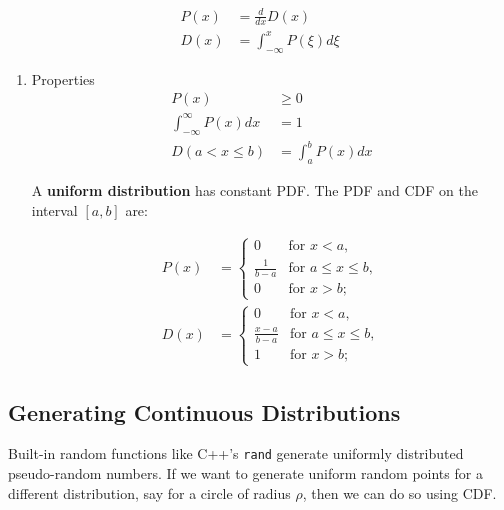 \documentclass[11pt]{article}
\begin{document}
\begin{align*}
    P\left( x \right) &= \frac{d}{dx}D\left( x \right) \\
    D\left( x \right) &= \int_{-\infty}^{x} P\left( \xi \right) d\xi
\end{align*}

\begin{enumerate}
\item Properties
\label{sec:orgbbf2d6b}
 \begin{align*}
     P\left( x \right) &\geq 0 \\
     \int_{-\infty}^{\infty} P\left( x \right)dx &= 1 \\
     D\left( a < x \leq b \right) &= \int_{a}^{b} P\left( x \right)dx
\end{align*}

A \textbf{uniform distribution} has constant PDF. The PDF and CDF on the interval \(\left[ a,b \right]\) are:

\begin{align*}
    P\left( x \right) &= \begin{cases}
                             0 &\text{for } x < a, \\
                             \frac{1}{b - a} &\text{for } a \leq x \leq b, \\
                             0 &\text{for } x > b;
                         \end{cases} \\
    D\left( x \right) &= \begin{cases}
                             0 &\text{for } x < a, \\
                             \frac{x - a}{b - a} &\text{for } a \leq x \leq b, \\
                             1 &\text{for } x > b;
                         \end{cases}
\end{align*}
\end{enumerate}

\subsection{Generating Continuous Distributions}
\label{sec:orgdc2ac13}
Built-in random functions like C++'s \texttt{rand} generate uniformly distributed pseudo-random numbers. If we want to generate uniform random points for a different distribution, say for a circle of radius \(\rho\), then we can do so using CDF.
\end{document}
